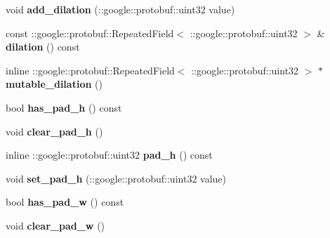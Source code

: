 \begin{DoxyCompactItemize}
void {\bfseries add\+\_\+dilation} (\+::google\+::protobuf\+::uint32 value)
\item 
\mbox{\label{classcaffe_1_1_convolution_parameter_a08aedbbe4a021ec107b12f29413b0c8d}} 
const \+::google\+::protobuf\+::\+Repeated\+Field$<$ \+::google\+::protobuf\+::uint32 $>$ \& {\bfseries dilation} () const
\item 
\mbox{\label{classcaffe_1_1_convolution_parameter_a28c90f889548ce27b8267d15c4d77d10}} 
inline \+::google\+::protobuf\+::\+Repeated\+Field$<$ \+::google\+::protobuf\+::uint32 $>$ $\ast$ {\bfseries mutable\+\_\+dilation} ()
\item 
\mbox{\label{classcaffe_1_1_convolution_parameter_a02b12d3da48a22df8362d1f6c9ff0de9}} 
bool {\bfseries has\+\_\+pad\+\_\+h} () const
\item 
\mbox{\label{classcaffe_1_1_convolution_parameter_ab3d59c37a0e3799a3b07ea22c5f2453b}} 
void {\bfseries clear\+\_\+pad\+\_\+h} ()
\item 
\mbox{\label{classcaffe_1_1_convolution_parameter_a362651a0892260328c3d99505f3e482f}} 
inline \+::google\+::protobuf\+::uint32 {\bfseries pad\+\_\+h} () const
\item 
\mbox{\label{classcaffe_1_1_convolution_parameter_ab615a4ad7ac7830475fc13d3f9ed4bf5}} 
void {\bfseries set\+\_\+pad\+\_\+h} (\+::google\+::protobuf\+::uint32 value)
\item 
\mbox{\label{classcaffe_1_1_convolution_parameter_a7f112f2ea70f9ebc539a2ae91e87e07e}} 
bool {\bfseries has\+\_\+pad\+\_\+w} () const
\item 
\mbox{\label{classcaffe_1_1_convolution_parameter_ac4e82a36d4adc5824af908a4e9f13bef}} 
void {\bfseries clear\+\_\+pad\+\_\+w} ()
\item 
\mbox{\label{classcaffe_1_1_convolution_parameter_ad84a1213878fab22bab1ab5a85b1bec0}} 

\end{DoxyCompactItemize}
